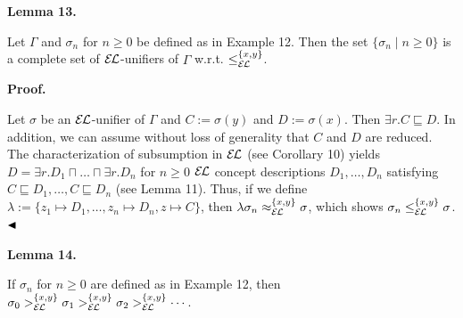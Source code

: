 \documentclass[10pt,a4paper]{amsart}
\begin{document}
 
\par\medskip\noindent\textbf{Lemma 13.}\par
 
 
Let $\Gamma$ and $\sigma_{n}$ for $n\geq 0$ be defined as in Example 12. Then the set $\{\sigma_{n}\mid n\geq 0\}$ is a complete set of $\mathcal{E\mkern-1.618muL}$-unifiers of $\Gamma$ w.r.t. $\leq_{\mathcal{E\mkern-1.618muL}}^{\{x,y\}}$.\par
 
 
 
 
\par\medskip\noindent\textbf{Proof.}\par
 
 
Let $\sigma$ be an $\mathcal{E\mkern-1.618muL}$-unifier of $\Gamma$ and $C:=\sigma(y)$ and $D:=\sigma(x)$. Then $\exists r.C\sqsubseteq D$. In addition, we can assume without loss of generality that $C$ and $D$ are reduced. The characterization of subsumption in $\mathcal{E\mkern-1.618muL}$ (see Corollary 10) yields $D=\exists r.D_{1}\sqcap\ldots\sqcap\exists r.D_{n}$ for $n\geq 0$ $\mathcal{E\mkern-1.618muL}$ concept descriptions $D_{1},\ldots,D_{n}$ satisfying $C\sqsubseteq D_{1},\ldots,C\sqsubseteq D_{n}$ (see Lemma 11). Thus, if we define $\lambda:=\{z_{1}\mapsto D_{1},\ldots,z_{n}\mapsto D_{n},z\mapsto C\}$, then $\lambda\sigma_{n}\approx_{\mathcal{E\mkern-1.618muL}}^{\{x,y\}}\sigma$, which shows $\sigma_{n}\leq_{\mathcal{E\mkern-1.618muL}}^{\{x,y\}}\sigma$. $\hfill\blacktriangleleft$\par
 
 
 
\par\medskip\noindent\textbf{Lemma 14.}\par
 
 
If $\sigma_{n}$ for $n\geq 0$ are defined as in Example 12, then $\sigma_{0}>_{\mathcal{E\mkern-1.618muL}}^{\{x,y\}}\sigma_{1}>_{\mathcal{E%
\mkern-1.618muL}}^{\{x,y\}}\sigma_{2}>_{\mathcal{E\mkern-1.618muL}}^{\{x,y\}}\cdots$.\par
 
\end{document}
